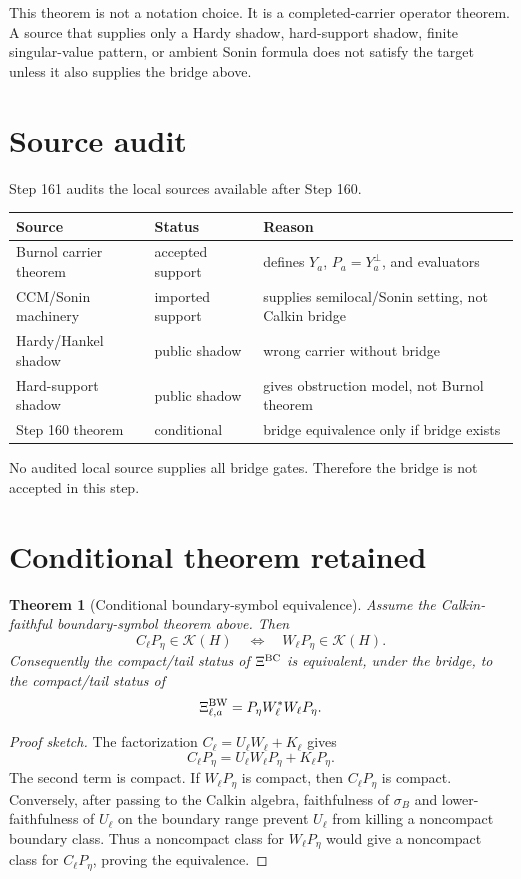 \documentclass[11pt]{article}
\newtheorem{theorem}{Theorem}
\begin{document}
This theorem is not a notation choice.  It is a completed-carrier operator
theorem.  A source that supplies only a Hardy shadow, hard-support shadow,
finite singular-value pattern, or ambient Sonin formula does not satisfy the
target unless it also supplies the bridge above.

\section{Source audit}

Step 161 audits the local sources available after Step 160.

\begin{center}
\begin{tabular}{lll}
\hline
Source & Status & Reason\\
\hline
Burnol carrier theorem & accepted support & defines \(Y_a\), \(P_a=Y_a^\perp\), and evaluators\\
CCM/Sonin machinery & imported support & supplies semilocal/Sonin setting, not Calkin bridge\\
Hardy/Hankel shadow & public shadow & wrong carrier without bridge\\
Hard-support shadow & public shadow & gives obstruction model, not Burnol theorem\\
Step 160 theorem & conditional & bridge equivalence only if bridge exists\\
\hline
\end{tabular}
\end{center}

No audited local source supplies all bridge gates.  Therefore the bridge is not
accepted in this step.

\section{Conditional theorem retained}

\begin{theorem}[Conditional boundary-symbol equivalence]
Assume the Calkin-faithful boundary-symbol theorem above.  Then
\[
  C_\ell P_\eta\in\mathcal K(H)
  \quad\Longleftrightarrow\quad
  W_\ell P_\eta\in\mathcal K(H).
\]
Consequently the compact/tail status of \(\Xi^{\rm BC}\) is equivalent, under
the bridge, to the compact/tail status of
\[
  \Xi^{\rm BW}_{\ell,a}
  =
  P_\eta W_\ell^*W_\ell P_\eta.
\]
\end{theorem}

\begin{proof}[Proof sketch]
The factorization \(C_\ell=U_\ell W_\ell+K_\ell\) gives
\[
  C_\ell P_\eta=U_\ell W_\ell P_\eta+K_\ell P_\eta.
\]
The second term is compact.  If \(W_\ell P_\eta\) is compact, then
\(C_\ell P_\eta\) is compact.  Conversely, after passing to the Calkin algebra,
faithfulness of \(\sigma_B\) and lower-faithfulness of \(U_\ell\) on the
boundary range prevent \(U_\ell\) from killing a noncompact boundary class.
Thus a noncompact class for \(W_\ell P_\eta\) would give a noncompact class for
\(C_\ell P_\eta\), proving the equivalence.
\end{proof}
\end{document}
